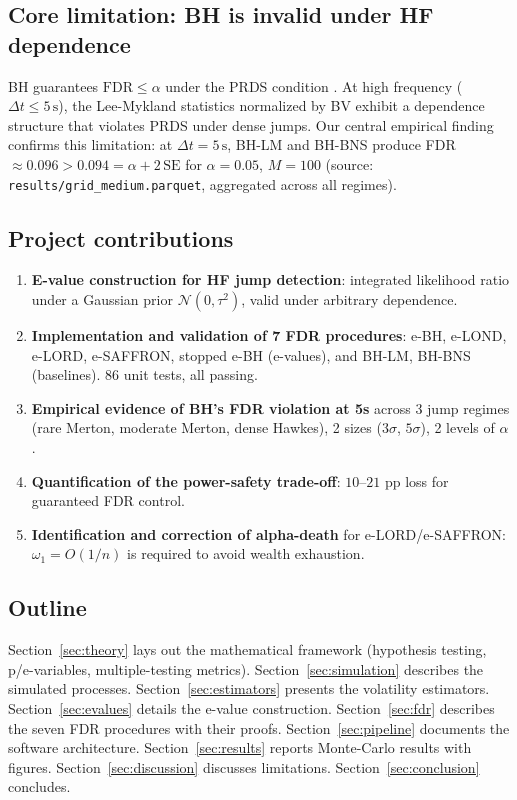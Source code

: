\documentclass[11pt,a4paper,twocolumn]{article}
\theoremstyle{plain}
\theoremstyle{definition}
\theoremstyle{remark}
\newcommand{\dt}{\Delta}
\newcommand{\FDR}{\mathrm{FDR}}
\begin{document}
\subsection{Core limitation: BH is invalid under HF dependence}

BH guarantees $\FDR \le \alpha$ under the PRDS condition \cite{BY2001}. At
high frequency ($\dt t \le 5\,\mathrm{s}$), the Lee-Mykland statistics normalized
by BV exhibit a dependence structure that violates PRDS under dense jumps.
Our central empirical finding confirms this limitation: at
$\dt t = 5\,\mathrm{s}$, BH-LM and BH-BNS produce
FDR $\approx 0.096 > 0.094 = \alpha + 2\,\mathrm{SE}$ for $\alpha = 0.05$,
$M = 100$ (source: \texttt{results/grid\_medium.parquet}, aggregated across
all regimes).

\subsection{Project contributions}

\begin{enumerate}
  \item \textbf{E-value construction for HF jump detection}: integrated
    likelihood ratio under a Gaussian prior $\mathcal{N}(0, \tau^2)$,
    valid under arbitrary dependence.
  \item \textbf{Implementation and validation of 7 FDR procedures}: e-BH,
    e-LOND, e-LORD, e-SAFFRON, stopped e-BH (e-values), and BH-LM, BH-BNS
    (baselines). 86 unit tests, all passing.
  \item \textbf{Empirical evidence of BH's FDR violation at 5s} across
    3 jump regimes (rare Merton, moderate Merton, dense Hawkes), 2 sizes
    ($3\sigma$, $5\sigma$), 2 levels of $\alpha$.
  \item \textbf{Quantification of the power-safety trade-off}: $10$--$21$ pp
    loss for guaranteed FDR control.
  \item \textbf{Identification and correction of alpha-death} for
    e-LORD/e-SAFFRON: $\omega_1 = O(1/n)$ is required to avoid wealth
    exhaustion.
\end{enumerate}

\subsection{Outline}

Section~\ref{sec:theory} lays out the mathematical framework
(hypothesis testing, p/e-variables, multiple-testing metrics).
Section~\ref{sec:simulation} describes the simulated processes.
Section~\ref{sec:estimators} presents the volatility estimators.
Section~\ref{sec:evalues} details the e-value construction.
Section~\ref{sec:fdr} describes the seven FDR procedures with their proofs.
Section~\ref{sec:pipeline} documents the software architecture.
Section~\ref{sec:results} reports Monte-Carlo results with figures.
Section~\ref{sec:discussion} discusses limitations.
Section~\ref{sec:conclusion} concludes.
\end{document}
